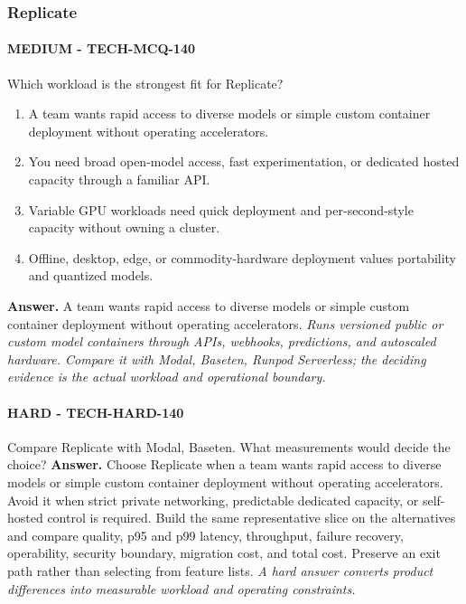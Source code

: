 \subsubsection*{Replicate}
\paragraph{MEDIUM - TECH-MCQ-140} Which workload is the strongest fit for Replicate?
\begin{enumerate}[label=\Alph*.]
\item A team wants rapid access to diverse models or simple custom container deployment without operating accelerators.
\item You need broad open-model access, fast experimentation, or dedicated hosted capacity through a familiar API.
\item Variable GPU workloads need quick deployment and per-second-style capacity without owning a cluster.
\item Offline, desktop, edge, or commodity-hardware deployment values portability and quantized models.
\end{enumerate}
\textbf{Answer.} A team wants rapid access to diverse models or simple custom container deployment without operating accelerators.
\textit{Runs versioned public or custom model containers through APIs, webhooks, predictions, and autoscaled hardware. Compare it with Modal, Baseten, Runpod Serverless; the deciding evidence is the actual workload and operational boundary.}
\paragraph{HARD - TECH-HARD-140} Compare Replicate with Modal, Baseten. What measurements would decide the choice?
\textbf{Answer.} Choose Replicate when a team wants rapid access to diverse models or simple custom container deployment without operating accelerators. Avoid it when strict private networking, predictable dedicated capacity, or self-hosted control is required. Build the same representative slice on the alternatives and compare quality, p95 and p99 latency, throughput, failure recovery, operability, security boundary, migration cost, and total cost. Preserve an exit path rather than selecting from feature lists.
\textit{A hard answer converts product differences into measurable workload and operating constraints.}
